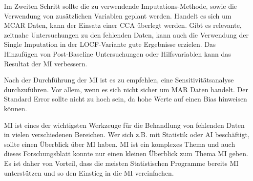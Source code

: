 Im Zweiten Schritt sollte die zu verwendende Imputations-Methode, sowie die Verwendung von zusätzlichen Variablen geplant 
werden. 
Handelt es sich um MCAR Daten, kann der Einsatz einer CCA überlegt werden. Gibt es relevante, zeitnahe Untersuchungen 
zu den fehlenden Daten, kann auch die Verwendung der Single Imputation in der LOCF-Variante gute Ergebnisse erzielen. 
Das Hinzufügen von Post-Baseline Untersuchungen oder Hilfsvariablen kann das Resultat der MI verbessern. 

Nach der Durchführung der MI ist es zu empfehlen, eine Sensitivitätsanalyse durchzuführen. Vor allem, wenn es sich nicht 
sicher um MAR Daten handelt. Der Standard Error sollte nicht zu hoch sein, da hohe Werte auf einen Bias hinweisen können.

MI ist eines der wichtigsten Werkzeuge für die Behandlung von fehlenden Daten in vielen verschiedenen Bereichen. 
Wer sich z.B. mit Statistik oder AI beschäftigt, sollte einen Überblick über MI haben. MI ist ein komplexes Thema und 
auch dieses Forschungsblatt konnte nur einen kleinen Überblick zum Thema MI geben. Es ist daher von Vorteil, dass die 
meisten Statistischen Programme bereits MI unterstützen und so den Einstieg in die MI vereinfachen. 


